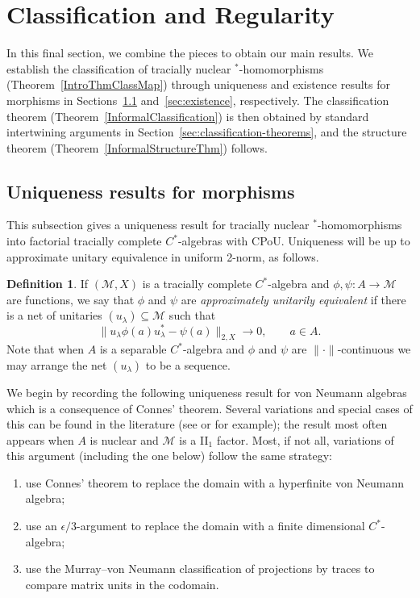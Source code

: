 \documentclass[a4paper,11pt]{amsart}
\theoremstyle{definition}
\newtheorem{definition}[theorem]{Definition}
\numberwithin{equation}{section}
\numberwithin{theorem}{section}
\newcommand{\M}{\mathcal{M}}
\begin{document}
\section{Classification and Regularity}\label{sec:Classification}

In this final section, we combine the pieces to obtain our main results.
We establish the classification of tracially nuclear $^*$-homomorphisms (Theorem~\ref{IntroThmClassMap}) through uniqueness and existence results for morphisms in Sections~\ref{sec:uniqueness} and~\ref{sec:existence}, respectively.
The classification theorem (Theorem~\ref{InformalClassification}) is then obtained by standard intertwining arguments in Section~\ref{sec:classification-theorems}, and the structure theorem (Theorem~\ref{InformalStructureThm}) follows.









\subsection{Uniqueness results for morphisms}\label{sec:uniqueness}

This subsection gives a uniqueness result for tracially nuclear $^*$-homomorphisms into factorial tracially complete $C^*$-algebras with CPoU.  Uniqueness will be up to approximate unitary equivalence in uniform 2-norm, as follows.

\begin{definition}
	If $(\mathcal M, X)$ is a tracially complete $C^*$-algebra and $\phi, \psi \colon A \rightarrow \M$ are functions, we say that $\phi$ and $\psi$ are \emph{approximately unitarily equivalent} if there is a net of unitaries $(u_\lambda) \subseteq \mathcal M$ such that \begin{equation} \|u_\lambda \phi(a) u_\lambda^* - \psi(a)\|_{2, X} \rightarrow 0, \qquad a \in A.
 \end{equation}
Note that when $A$ is a separable $C^*$-algebra and $\phi$ and $\psi$ are $\|\cdot\|$-continuous we may arrange the net $(u_\lambda)$ to be a sequence. 
\end{definition}

We begin by recording the following uniqueness result for von Neumann algebras which is a consequence of Connes' theorem.  Several variations and special cases of this can be found in the literature (see \cite[Proposition~2.1]{CGNN13} or \cite{DH05} for example);  the result most often appears when $A$ is nuclear and $\mathcal M$ is a II$_1$ factor.  Most, if not all, variations of this argument (including the one below) follow the same strategy:
\begin{enumerate}
	\item  use Connes' theorem to replace the domain with a hyperfinite von Neumann algebra;
	\item use an $\epsilon/3$-argument to replace the domain with a finite dimensional $C^*$-algebra;
	\item  use the Murray--von Neumann classification of projections by traces to compare matrix units in the codomain.
\end{enumerate}
\end{document}
